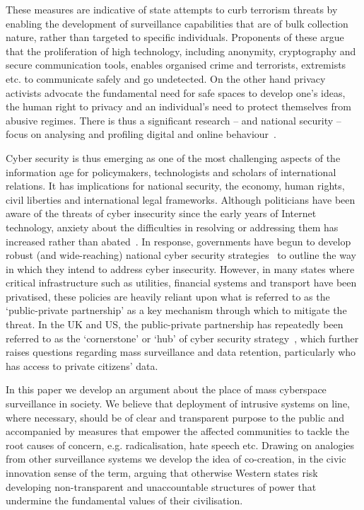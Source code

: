 \documentclass{llncs}
\begin{document}
These measures are indicative of state attempts to curb terrorism threats by enabling the development of surveillance capabilities that are of bulk collection nature, rather than targeted to specific individuals. Proponents of these argue that the proliferation of high technology, including anonymity, cryptography and secure communication tools, enables organised crime and terrorists, extremists etc. to communicate safely and go undetected. On the other hand privacy activists advocate the fundamental need for safe spaces to develop one's ideas, the human right to privacy and an individual's need to protect themselves from abusive regimes. There is thus a significant research -- and national security -- focus on analysing and profiling digital and online behaviour~\cite{gosling:2009,oatley+crick:2014}.

Cyber security is thus emerging as one of the most challenging aspects of the information age for policymakers, technologists and scholars of international relations. It has implications for national security, the economy, human rights, civil liberties and international legal frameworks. Although politicians have been aware of the threats of cyber insecurity since the early years of Internet technology, anxiety about the difficulties in resolving or addressing them has increased rather than abated~\cite{obama:2009,bisinfosecbreaches:2014,keepingukcybersafe:2014}. In response, governments have begun to develop robust (and wide-reaching) national cyber security strategies~\cite{gwbush:2003,ukcss:2011,ukcss:2014} to outline the way in which they intend to address cyber insecurity. However, in many states where critical infrastructure such as utilities, financial systems and transport have been privatised, these policies are heavily reliant upon what is referred to as the `public-private partnership' as a key mechanism through which to mitigate the threat. In the UK and US, the public-private partnership has repeatedly been referred to as the `cornerstone' or `hub' of cyber security strategy~\cite{carr+crick-csss2015}, which further raises questions regarding mass surveillance and data retention, particularly who has access to private citizens' data.

In this paper we develop an argument about the place of mass cyberspace surveillance in society. We believe that deployment of intrusive systems on line, where necessary, should be of clear and transparent purpose to the public and accompanied by measures that empower the affected communities to tackle the root causes of concern, e.g. radicalisation, hate speech etc. Drawing on analogies from other surveillance systems we develop the idea of co-creation, in the civic innovation sense of the term, arguing that otherwise Western states risk developing non-transparent and unaccountable structures of power that undermine the fundamental values of their civilisation.
\end{document}
